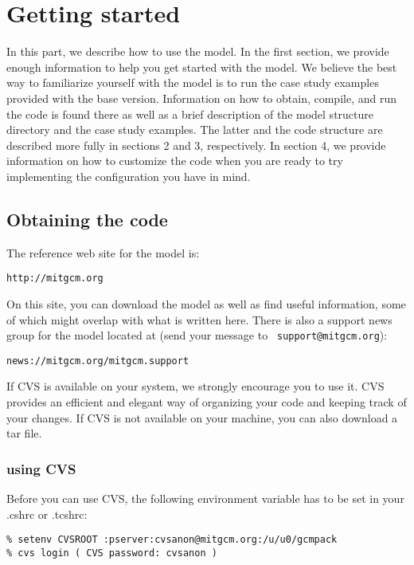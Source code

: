 
\section{Getting started}

In this part, we describe how to use the model. In the first section, we
provide enough information to help you get started with the model. We
believe the best way to familiarize yourself with the model is to run the
case study examples provided with the base version. Information on how to
obtain, compile, and run the code is found there as well as a brief
description of the model structure directory and the case study examples.
The latter and the code structure are described more fully in sections 2 and
3, respectively. In section 4, we provide information on how to customize
the code when you are ready to try implementing the configuration you have
in mind.

\subsection{Obtaining the code}

The reference web site for the model is:
\begin{verbatim}
http://mitgcm.org
\end{verbatim}

On this site, you can download the model as well as find useful information,
some of which might overlap with what is written here. There is also a
support news group for the model located at (send your message to \texttt{%
support@mitgcm.org}):
\begin{verbatim}
news://mitgcm.org/mitgcm.support
\end{verbatim}

If CVS is available on your system, we strongly encourage you to use it. CVS
provides an efficient and elegant way of organizing your code and keeping
track of your changes. If CVS is not available on your machine, you can also
download a tar file.

\subsubsection{using CVS}

Before you can use CVS, the following environment variable has to be set in
your .cshrc or .tcshrc:
\begin{verbatim}
% setenv CVSROOT :pserver:cvsanon@mitgcm.org:/u/u0/gcmpack
% cvs login ( CVS password: cvsanon )
\end{verbatim}

